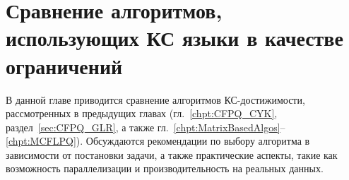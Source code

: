 \setchapterpreamble[u]{\margintoc}
\chapter{Сравнение алгоритмов, использующих КС языки в качестве ограничений}
\label{chpt:CFPQ_Comparison}

В данной главе приводится сравнение алгоритмов КС-достижимости, рассмотренных в предыдущих главах (гл.~\ref{chpt:CFPQ_CYK}, раздел~\ref{sec:CFPQ_GLR}, а также гл.~\ref{chpt:MatrixBasedAlgos}--\ref{chpt:MCFLPQ}).
Обсуждаются рекомендации по выбору алгоритма в зависимости от постановки задачи, а также практические аспекты, такие как возможность параллелизации и производительность на реальных данных.



